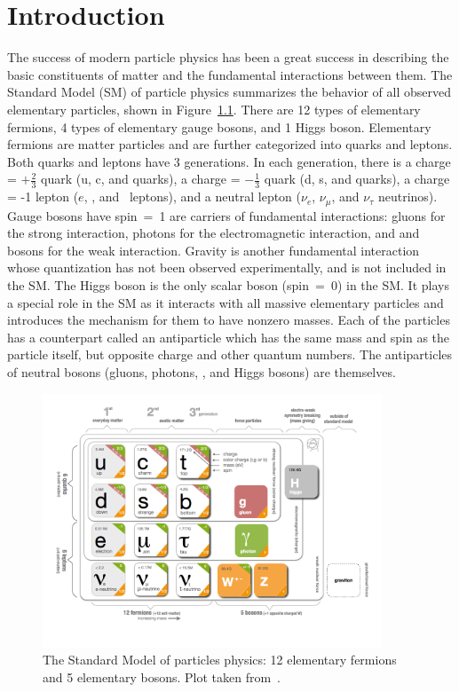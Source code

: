 \chapter{Introduction}

The success of modern particle physics has been a great success in describing the basic constituents of matter and the fundamental interactions between them.
The Standard Model (SM) of particle physics summarizes the behavior of all observed elementary particles, shown in Figure~\ref{fig:SM_table}.
There are 12 types of elementary fermions, 4 types of elementary gauge bosons, and 1 Higgs boson.
Elementary fermions are matter particles and are further categorized into quarks and leptons.
Both quarks and leptons have 3 generations.
In each generation, there is a charge = $+\frac{2}{3}$ quark (u, c, and \Pqt quarks),
a charge = $-\frac{1}{3}$ quark (d, s, and \Pqb quarks), 
a charge = -1 lepton ($e$, \mu, and \tau ~leptons),
and a neutral lepton ($\nu_{e}$, $\nu_{\mu}$, and $\nu_{\tau}$ neutrinos).
Gauge bosons have spin~=~1 are carriers of fundamental interactions: 
gluons for the strong interaction, photons for the electromagnetic interaction,
and \PW and \PZ bosons for the weak interaction.
Gravity is another fundamental interaction whose quantization has not been observed experimentally,
and is not included in the SM.
The Higgs boson is the only scalar boson (spin~=~0) in the SM.
It plays a special role in the SM as it interacts with all massive elementary particles 
and introduces the mechanism for them to have nonzero masses.
Each of the particles has a counterpart called an antiparticle which has the same mass and spin as the particle itself, 
but opposite charge and other quantum numbers.
The antiparticles of neutral bosons (gluons, photons, \PZ, and Higgs bosons) are themselves.

\begin{figure}[!htb]
    \centering
    \captionsetup{justification=justified}
    \includegraphics[width=0.9\textwidth]{pics/Intro/standard_model_cern.png}
    \caption{The Standard Model of particles physics: 12 elementary fermions and 5 elementary bosons.
             Plot taken from~\cite{SM_table_CERN}. }
    \label{fig:SM_table}
\end{figure}

